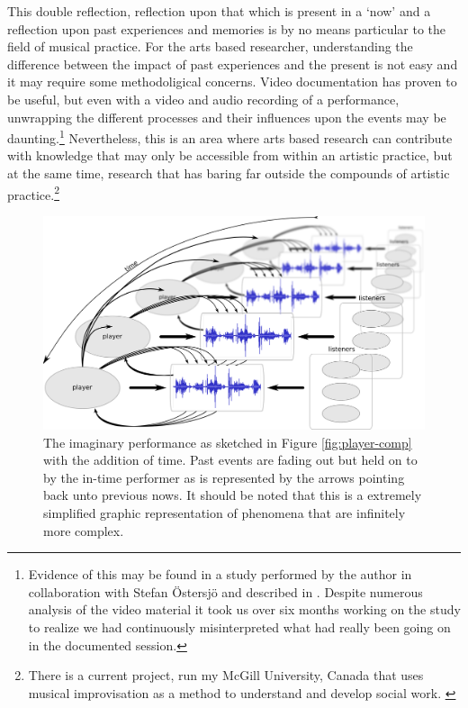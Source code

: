 This double reflection, reflection upon that which is present in a `now' and a reflection upon past experiences and memories is by no means particular to the field of musical practice. For the arts based researcher, understanding the difference between the impact of past experiences and the present is not easy and it may require some methodoligical concerns. Video documentation has proven to be useful, but even with a video and audio recording of a performance, unwrapping the different processes and their influences upon the events may be daunting.\footnote{Evidence of this may be found in a study performed by the author in collaboration with Stefan Östersjö and described in \cite{frisk-ost06,frisk-ost06-2}. Despite numerous analysis of the video material it took us over six months working on the study to realize we had continuously misinterpreted what had really been going on in the documented session.} Nevertheless, this is an area where arts based research can contribute with knowledge that may only be accessible from within an artistic practice, but at the same time, research that has baring far outside the compounds of artistic practice.\footnote{There is a current project, run my McGill University, Canada that uses musical improvisation as a method to understand and develop social work. \cite{lewis09}}

\begin{figure}[htb]
  \centering
  \includegraphics[width=\linewidth]{img/players-perspective}
  \caption{The imaginary performance as sketched in Figure \ref{fig:player-comp} with the addition of time. Past events are fading out but held on to by the in-time performer as is represented by the arrows pointing back unto previous nows. It should be noted that this is a extremely simplified graphic representation of phenomena that are infinitely more complex.}
  \label{fig:u}
\end{figure}


